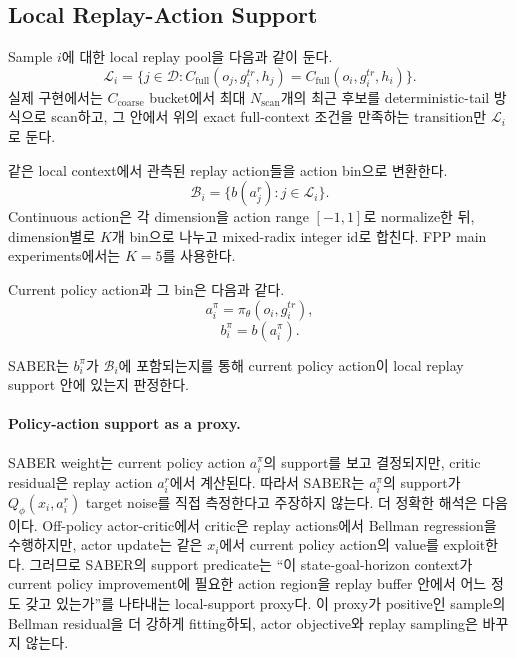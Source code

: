 \documentclass[letterpaper]{article}
\begin{document}
\subsection{Local Replay-Action Support}

Sample \(i\)에 대한 local replay pool을 다음과 같이 둔다.
\begin{equation}
\mathcal L_i =
\{j \in \mathcal D:
C_{\mathrm{full}}(o_j,g_i^{tr},h_j)
= C_{\mathrm{full}}(o_i,g_i^{tr},h_i)\}.
\end{equation}
실제 구현에서는 \(C_{\mathrm{coarse}}\) bucket에서 최대 \(N_{\mathrm{scan}}\)개의 최근 후보를 deterministic-tail 방식으로 scan하고, 그 안에서 위의 exact full-context 조건을 만족하는 transition만 \(\mathcal L_i\)로 둔다.

같은 local context에서 관측된 replay action들을 action bin으로 변환한다.
\begin{equation}
\mathcal B_i = \{b(a_j^r): j\in \mathcal L_i\}.
\end{equation}
Continuous action은 각 dimension을 action range \([-1,1]\)로 normalize한 뒤, dimension별로 \(K\)개 bin으로 나누고 mixed-radix integer id로 합친다. FPP main experiments에서는 \(K=5\)를 사용한다.

Current policy action과 그 bin은 다음과 같다.
\begin{equation}
a_i^\pi = \pi_\theta(o_i,g_i^{tr}),
\end{equation}
\begin{equation}
b_i^\pi = b(a_i^\pi).
\end{equation}

SABER는 \(b_i^\pi\)가 \(\mathcal B_i\)에 포함되는지를 통해 current policy action이 local replay support 안에 있는지 판정한다.

\paragraph{Policy-action support as a proxy.}
SABER weight는 current policy action \(a_i^\pi\)의 support를 보고 결정되지만, critic residual은 replay action \(a_i^r\)에서 계산된다. 따라서 SABER는 \(a_i^\pi\)의 support가 \(Q_\phi(x_i,a_i^r)\) target noise를 직접 측정한다고 주장하지 않는다. 더 정확한 해석은 다음이다. Off-policy actor-critic에서 critic은 replay actions에서 Bellman regression을 수행하지만, actor update는 같은 \(x_i\)에서 current policy action의 value를 exploit한다. 그러므로 SABER의 support predicate는 ``이 state-goal-horizon context가 current policy improvement에 필요한 action region을 replay buffer 안에서 어느 정도 갖고 있는가''를 나타내는 local-support proxy다. 이 proxy가 positive인 sample의 Bellman residual을 더 강하게 fitting하되, actor objective와 replay sampling은 바꾸지 않는다.
\end{document}
